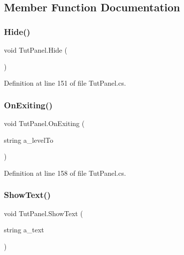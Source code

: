 \subsection{Member Function Documentation}
\mbox{\label{class_tut_panel_ac85f2a1d6c69ab03e9d82d8cae6a8a5e}} 
\subsubsection{\texorpdfstring{Hide()}{Hide()}}
{\footnotesize\ttfamily void Tut\+Panel.\+Hide (\begin{DoxyParamCaption}{ }\end{DoxyParamCaption})}



Definition at line 151 of file Tut\+Panel.\+cs.

\mbox{\label{class_tut_panel_afc3dfe52f0b733154d4094f78311398b}} 
\subsubsection{\texorpdfstring{On\+Exiting()}{OnExiting()}}
{\footnotesize\ttfamily void Tut\+Panel.\+On\+Exiting (\begin{DoxyParamCaption}\item[{string}]{a\+\_\+level\+To }\end{DoxyParamCaption})}



Definition at line 158 of file Tut\+Panel.\+cs.

\mbox{\label{class_tut_panel_a6df66bbb3483f990b9fc25190d14f31b}} 
\subsubsection{\texorpdfstring{Show\+Text()}{ShowText()}}
{\footnotesize\ttfamily void Tut\+Panel.\+Show\+Text (\begin{DoxyParamCaption}\item[{string}]{a\+\_\+text }\end{DoxyParamCaption})}



